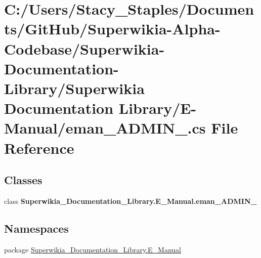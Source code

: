 \hypertarget{_e-_manual_2eman___a_d_m_i_n___8cs}{\section{C\+:/\+Users/\+Stacy\+\_\+\+Staples/\+Documents/\+Git\+Hub/\+Superwikia-\/\+Alpha-\/\+Codebase/\+Superwikia-\/\+Documentation-\/\+Library/\+Superwikia Documentation Library/\+E-\/\+Manual/eman\+\_\+\+A\+D\+M\+I\+N\+\_\+.cs File Reference}
\label{_e-_manual_2eman___a_d_m_i_n___8cs}
}
\subsection*{Classes}
\begin{DoxyCompactItemize}
\item 
class {\bfseries Superwikia\+\_\+\+Documentation\+\_\+\+Library.\+E\+\_\+\+Manual.\+eman\+\_\+\+A\+D\+M\+I\+N\+\_\+}
\end{DoxyCompactItemize}
\subsection*{Namespaces}
\begin{DoxyCompactItemize}
\item 
package \hyperlink{namespace_superwikia___documentation___library_1_1_e___manual}{Superwikia\+\_\+\+Documentation\+\_\+\+Library.\+E\+\_\+\+Manual}
\end{DoxyCompactItemize}
